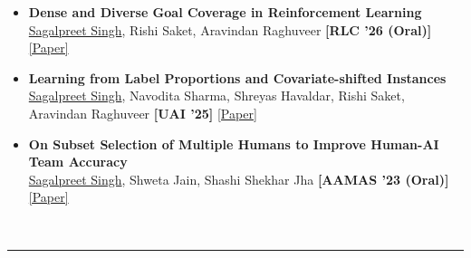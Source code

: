 \documentclass[10pt, letterpaper]{article}
\newcommand{\cvsection}[2][]{
  \vspace{10pt}
  \noindent{\large\scshape\textcolor{myblue}{#2} \hfill \scriptsize\scshape #1} \\
  \vspace{-6pt}
  \hrule
  \vspace{6pt}
}
\begin{document}
\begin{itemize}[leftmargin=3em, labelsep=0.5em, itemsep=4pt, parsep=0pt, topsep=0pt]
    \item[\textbf{[C.3]}] \hypertarget{C3}{} \textbf{Dense and Diverse Goal Coverage in Reinforcement Learning} \\
    \underline{Sagalpreet Singh}, Rishi Saket, Aravindan Raghuveer \quad \textbf{[RLC '26 (Oral)]} \hfill \href{https://arxiv.org/abs/2510.25311}{\textcolor{myblue}{[Paper]}}

    \item[\textbf{[C.2]}] \hypertarget{C2}{} \textbf{Learning from Label Proportions and Covariate-shifted Instances} \\
    \underline{Sagalpreet Singh}, Navodita Sharma, Shreyas Havaldar, Rishi Saket, Aravindan Raghuveer \quad \textbf{[UAI '25]} \hfill \href{https://arxiv.org/pdf/2411.12334}{\textcolor{myblue}{[Paper]}}

    \item[\textbf{[C.1]}] \hypertarget{C1}{} \textbf{On Subset Selection of Multiple Humans to Improve Human-AI Team Accuracy} \\
    \underline{Sagalpreet Singh}, Shweta Jain, Shashi Shekhar Jha \quad \textbf{[AAMAS '23 (Oral)]} \hfill \href{https://www.ifaamas.org/Proceedings/aamas2023/pdfs/p317.pdf}{\textcolor{myblue}{[Paper]}}
\end{itemize}

\cvsection{Experience}
\end{document}

